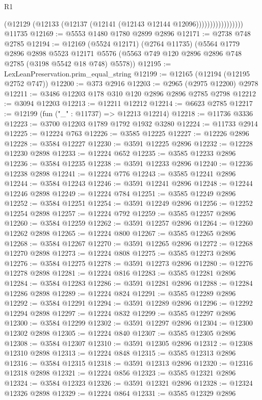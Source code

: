 \begin{lexlean}{R1}
\begin{coremodule}
                            (@12129 (@12133 (@12137 (@12141 (@12143 @12144 @12096)))))))))))))))))
    @11735
@12169 := @5553 @1480 @1780 @2899 @2896
@12171 := @2738 @748 @2785
@12194 := @12169
    (@5524 @12171)
    (@2764 @11735)
    (@5564
      @1779
      @2896
      @2898
      @5523
      @12171
      @5576
      (@5563 @749 @120 @2896 @2896 @748 @2785 (@3198 @5542 @18 @748) @5578))
@12195 := LexLeanPreservation.prim_equal_string
@12199 := @12165 (@12194 (@12195 @2752 @747))
@12200 := @373 @2916
@12203 := @2965 (@2975 @12200) @2978
@12211 := @3486 @12203 @178 @310 @120 @2896 @2896 @2785 @2798
@12212 := @3094 @12203
@12213 := @12211 @12212
@12214 := @6623 @2785
@12217 := @12199 (fun ("_" : @11737) => @12213 @12214)
@12218 := @11736 @3336
@12223 := @3700 @12203 @1789 @1792 @1932 @3280
@12224 := @11733 @2914
@12225 := @12224 @763
@12226 := @3585 @12225
@12227 := @12226 @2896
@12228 := @3584 @12227
@12230 := @3591 @12225 @2896
@12232 := @12228 @12230 @2898
@12233 := @12224 @652
@12235 := @3585 @12233 @2896
@12236 := @3584 @12235
@12238 := @3591 @12233 @2896
@12240 := @12236 @12238 @2898
@12241 := @12224 @776
@12243 := @3585 @12241 @2896
@12244 := @3584 @12243
@12246 := @3591 @12241 @2896
@12248 := @12244 @12246 @2898
@12249 := @12224 @784
@12251 := @3585 @12249 @2896
@12252 := @3584 @12251
@12254 := @3591 @12249 @2896
@12256 := @12252 @12254 @2898
@12257 := @12224 @792
@12259 := @3585 @12257 @2896
@12260 := @3584 @12259
@12262 := @3591 @12257 @2896
@12264 := @12260 @12262 @2898
@12265 := @12224 @800
@12267 := @3585 @12265 @2896
@12268 := @3584 @12267
@12270 := @3591 @12265 @2896
@12272 := @12268 @12270 @2898
@12273 := @12224 @808
@12275 := @3585 @12273 @2896
@12276 := @3584 @12275
@12278 := @3591 @12273 @2896
@12280 := @12276 @12278 @2898
@12281 := @12224 @816
@12283 := @3585 @12281 @2896
@12284 := @3584 @12283
@12286 := @3591 @12281 @2896
@12288 := @12284 @12286 @2898
@12289 := @12224 @824
@12291 := @3585 @12289 @2896
@12292 := @3584 @12291
@12294 := @3591 @12289 @2896
@12296 := @12292 @12294 @2898
@12297 := @12224 @832
@12299 := @3585 @12297 @2896
@12300 := @3584 @12299
@12302 := @3591 @12297 @2896
@12304 := @12300 @12302 @2898
@12305 := @12224 @840
@12307 := @3585 @12305 @2896
@12308 := @3584 @12307
@12310 := @3591 @12305 @2896
@12312 := @12308 @12310 @2898
@12313 := @12224 @848
@12315 := @3585 @12313 @2896
@12316 := @3584 @12315
@12318 := @3591 @12313 @2896
@12320 := @12316 @12318 @2898
@12321 := @12224 @856
@12323 := @3585 @12321 @2896
@12324 := @3584 @12323
@12326 := @3591 @12321 @2896
@12328 := @12324 @12326 @2898
@12329 := @12224 @864
@12331 := @3585 @12329 @2896

\end{coremodule}
\end{lexlean}
